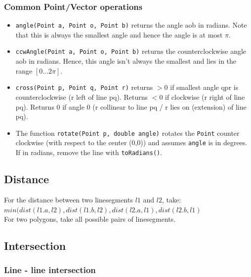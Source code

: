 \documentclass[a4paper,10pt]{article}
\begin{document}
\begin{multicols}{2}
\subsubsection{Common Point/Vector operations}\label{sec:PointCommon}
\begin{itemize}[nolistsep,noitemsep]
\itemsep0em
\item \lstinline|angle(Point a, Point o, Point b)| returns the angle aob in radians. Note that this is always the smallest angle and hence the angle is at most $\pi$.
\item \lstinline|ccwAngle(Point a, Point o, Point b)| returns the counterclockwise angle aob in radians. Hence, this angle isn't always the smallest and lies in the range $[0\ldots 2\pi]$.
\item \lstinline|cross(Point p, Point q, Point r)| returns $>0$ if smallest angle qpr is counterclockwise (r left of line pq). Returns $< 0$ if clockwise (r right of line pq). Returns  0 if angle 0 (r collinear to line pq / r lies on (extension) of line pq).
\item The function \lstinline|rotate(Point p, double angle)| rotates the \lstinline|Point| counter clockwise (with respect to the center (0,0)) and assumes \lstinline|angle| is in degrees. If in radians, remove the line with \lstinline|toRadians()|.
\end{itemize}

\subsection{Distance}
For the distance between two linesegments $l1$ and $l2$, take: \\$min(dist(l1.a, l2), dist(l1.b,l2),dist(l2.a,l1),dist(l2.b,l1)$\\ For two polygons, take all possible pairs of linesegments.

\subsection{Intersection}
\subsubsection{Line - line intersection}

%

\end{multicols}
\end{document}
